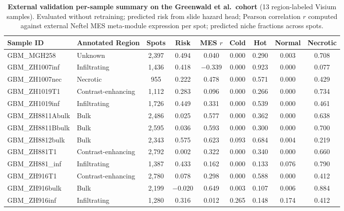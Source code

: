 \documentclass[11pt,letterpaper]{article}
\begin{document}
\begin{table}[H]
\centering
\caption{\textbf{External validation per-sample summary on the Greenwald et al.\ cohort} (13 region-labeled Visium samples). Evaluated without retraining; predicted risk from slide hazard head; Pearson correlation $r$ computed against external Neftel MES meta-module expression per spot; predicted niche fractions across spots.}
\label{tab:s2}
\footnotesize
\setlength{\tabcolsep}{4pt}
\begin{tabular}{llccccccc}
\toprule
\textbf{Sample ID} & \textbf{Annotated Region} & \textbf{Spots} & \textbf{Risk} & \textbf{MES $r$} & \textbf{Cold} & \textbf{Hot} & \textbf{Normal} & \textbf{Necrotic} \\
\midrule
GBM\_MGH258      & Unknown            & 2{,}397 & 0.494  & 0.040  & 0.000 & 0.290 & 0.003 & 0.708 \\
GBM\_ZH1007inf   & Infiltrating       & 1{,}436 & 0.418  & $-$0.339 & 0.000 & 0.923 & 0.000 & 0.077 \\
GBM\_ZH1007nec   & Necrotic           & 955   & 0.222  & 0.478  & 0.000 & 0.571 & 0.000 & 0.429 \\
GBM\_ZH1019T1    & Contrast-enhancing & 1{,}112 & 0.283  & 0.096  & 0.000 & 0.266 & 0.000 & 0.734 \\
GBM\_ZH1019inf   & Infiltrating       & 1{,}726 & 0.449  & 0.331  & 0.000 & 0.539 & 0.000 & 0.461 \\
GBM\_ZH8811Abulk & Bulk               & 2{,}486 & 0.025  & 0.577  & 0.000 & 0.362 & 0.000 & 0.638 \\
GBM\_ZH8811Bbulk & Bulk               & 2{,}595 & 0.036  & 0.593  & 0.000 & 0.300 & 0.000 & 0.700 \\
GBM\_ZH8812bulk  & Bulk               & 2{,}343 & 0.575  & 0.623  & 0.093 & 0.684 & 0.004 & 0.219 \\
GBM\_ZH881T1     & Contrast-enhancing & 2{,}792 & 0.002  & 0.322  & 0.000 & 0.340 & 0.000 & 0.660 \\
GBM\_ZH881\_inf  & Infiltrating       & 1{,}387 & 0.433  & 0.162  & 0.000 & 0.133 & 0.076 & 0.790 \\
GBM\_ZH916T1     & Contrast-enhancing & 2{,}780 & 0.078  & 0.298  & 0.000 & 0.588 & 0.000 & 0.412 \\
GBM\_ZH916bulk   & Bulk               & 2{,}199 & $-$0.020 & 0.649 & 0.003 & 0.107 & 0.006 & 0.884 \\
GBM\_ZH916inf    & Infiltrating       & 1{,}280 & 0.316  & 0.012  & 0.265 & 0.148 & 0.174 & 0.412 \\
\bottomrule
\end{tabular}
\end{table}
\end{document}
